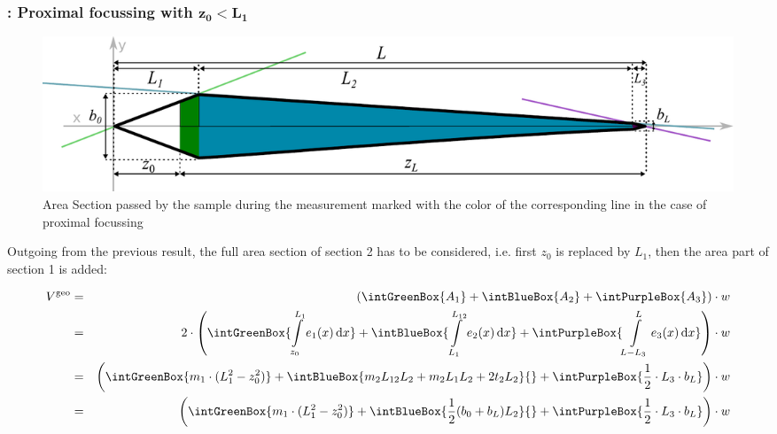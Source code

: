 \subsubsection*{\Vgeo: Proximal focussing with $\bm{z_0 < L_1}$}
\begin{figure}[h]
  \begin{center}
    \includegraphics[width=0.95\linewidth]{./images/fffVolume2.pdf}    
  \end{center}
  \vspace*{-3ex}    
  \caption[Passed area section - proximal focussing]{Area Section passed by the sample during the measurement marked 
  with the color of the corresponding line in the case of proximal focussing}
  \label{fig:fffVolume2} 
\end{figure}
Outgoing from the previous result, the full area section of section 2 has to be considered, i.e. first $z_0$ is 
replaced by $L_1$, then the area part of section 1 is added:

\begin{align}
  \Vgeo & = &\left( \intGreenBox{\ensuremath{A_1}} +  \intBlueBox{\ensuremath{A_2}} + \intPurpleBox{\ensuremath{A_3}}\right) \cdot w\nonumber \\  
        & =&2 \cdot \left(
             \intGreenBox {\ensuremath{ \int\limits_{z_0}^{L_{1}} e_1(x) \diff x }}
             + \intBlueBox {\ensuremath{ \int\limits_{L_1}^{L_{12}} e_2(x) \diff x }}
             + \intPurpleBox{\ensuremath{  \int\limits_{L-L_3}^{L} e_3(x) \diff x }}    
             \right) \cdot w \nonumber \\
        &  =&\left(
              \intGreenBox {\ensuremath{ m_1 \cdot ( L_1^2 - z_0^2) }}
              + \intBlueBox{\ensuremath{ m_2L_{12}L_2 + m_2L_1L_2 + 2t_2L_2}}{ }
              + \intPurpleBox{\ensuremath{ \frac{1}{2} \cdot L_3 \cdot \bL  } }
              \right) \cdot w   \nonumber\\
        &  =&\left(
              \intGreenBox {\ensuremath{ m_1 \cdot ( L_1^2 - z_0^2) }}
              + \intBlueBox{\ensuremath{   \frac{1}{2} (b_0 + b_L) L_2  }  }{ }
              + \intPurpleBox{\ensuremath{ \frac{1}{2} \cdot L_3 \cdot \bL  } }
              \right) \cdot w         
              \label{eq:proxFocusVolume}
\end{align}